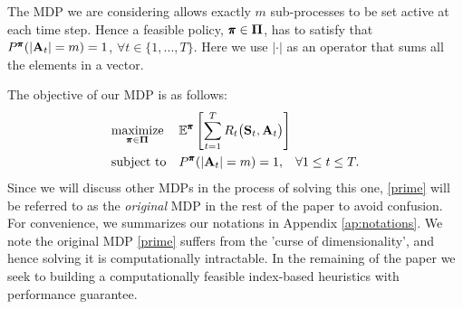 The MDP we are considering allows exactly $m$ sub-processes to be set active at each time step. Hence a feasible policy, $\pmb{\pi}\in\mathbf{\Pi}$, has to satisfy that $P^{\pmb{\pi}}(|\mathbf{A}_t|=m)=1$, $\forall t\in\{1,...,T\}$. Here we use $|\cdot|$ as an operator that sums all the elements in a vector.  

The objective of our MDP is as follows:
\begin{equation}\label{prime}
\begin{aligned}
& \underset{\pmb{\pi}\in\mathbf{\Pi}}{\text{maximize}}
& & \mathbb{E}^{\pmb{\pi}}\left[\sum_{t=1}^{T}R_t\big(\mathbf{S}_t,\mathbf{A}_t\big)\right] \\
& \text{subject to}
& & P^{\pmb{\pi}}(|\mathbf{A}_t|=m)=1, \hspace{3mm}\forall 1\leq t\leq T .
\end{aligned}
\end{equation}
Since we will discuss other MDPs in the process of solving this one,  \eqref{prime} will be referred to as the \textit{original} MDP in the rest of the paper to avoid confusion.  
For convenience, we summarizes our notations in Appendix \ref{ap:notations}. We note the original MDP \eqref{prime} suffers from the 'curse of dimensionality', and hence solving it is computationally intractable. In the remaining of the paper we seek to building a computationally feasible index-based heuristics with performance guarantee.




